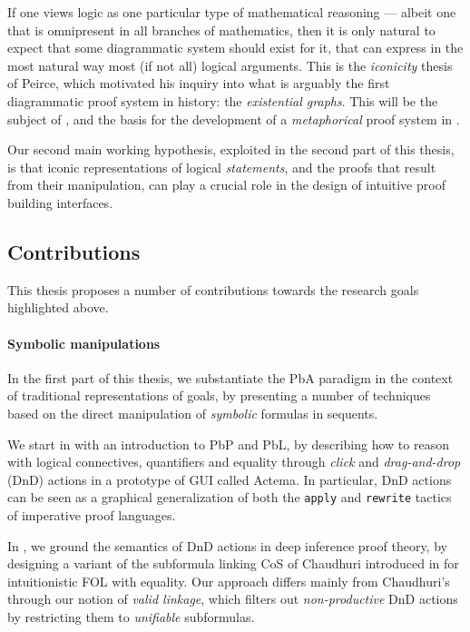 If one views logic as one particular type of mathematical reasoning --- albeit
one that is omnipresent in all branches of mathematics, then it is only natural
to expect that some diagrammatic system should exist for it, that can express in
the most natural way most (if not all) logical arguments. This is the
\emph{iconicity} thesis of Peirce, which motivated his inquiry into what is
arguably the first diagrammatic proof system in history: the \emph{existential
graphs}. This will be the subject of , and the basis for the
development of a \emph{metaphorical} proof system in .

\begin{emphpar}
  Our second main working hypothesis, exploited in the second part of this
  thesis, is that iconic representations of logical \emph{statements}, and the
  proofs that result from their manipulation, can play a crucial role in the
  design of intuitive proof building interfaces.
\end{emphpar}

\subsection{Contributions}

This thesis proposes a number of contributions towards the research goals
highlighted above.

\paragraph{Symbolic manipulations}
  
In the first part of this thesis, we substantiate the PbA paradigm in the
context of traditional representations of goals, by presenting a number of
techniques based on the direct manipulation of \emph{symbolic} formulas in
sequents.

We start in  with an introduction to PbP and PbL, by describing how
to reason with logical connectives, quantifiers and equality through
\emph{click} and \emph{drag-and-drop} (DnD) actions in a prototype of GUI called
Actema. In particular, DnD actions can be seen as a graphical generalization of
both the \texttt{apply} and \texttt{rewrite} tactics of imperative proof
languages.

In , we ground the semantics of DnD actions in deep inference proof
theory, by designing a variant of the subformula linking CoS of Chaudhuri
introduced in \cite{Chaudhuri2013} for intuitionistic FOL with equality. Our
approach differs mainly from Chaudhuri's through our notion of \emph{valid
linkage}, which filters out \emph{non-productive} DnD actions by restricting
them to \emph{unifiable} subformulas.

